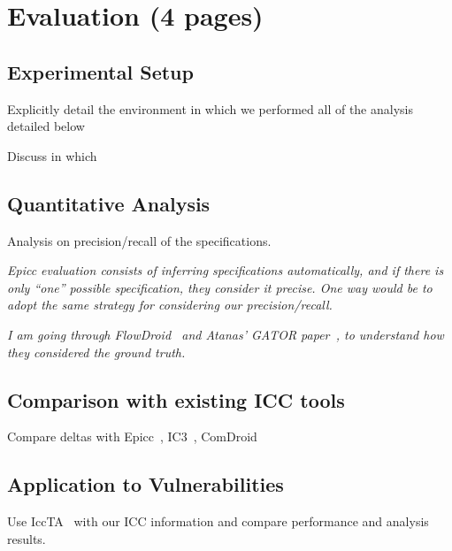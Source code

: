 \section{Evaluation (4 pages)}

\subsection{Experimental Setup}

Explicitly detail the environment in which we performed all of the analysis detailed below

Discuss in which 

\subsection{Quantitative Analysis}

Analysis on precision/recall of the specifications. 

\emph{Epicc evaluation consists of inferring specifications automatically, and if there is only ``one'' possible specification, they consider it precise. One way would be to adopt the same strategy for considering our precision/recall. }

\emph{I am going through FlowDroid~\cite{flowdroid} and Atanas' GATOR paper~\cite{analysis-callbacks-android}, to understand how they considered the ground truth.}

\subsection{Comparison with existing ICC tools}

Compare deltas with Epicc~\cite{epicc}, IC3~\cite{ic3-icse15}, ComDroid~\cite{comdroid}

\subsection{Application to Vulnerabilities}

Use IccTA~\cite{iccta} with our ICC information and compare performance and analysis results. 